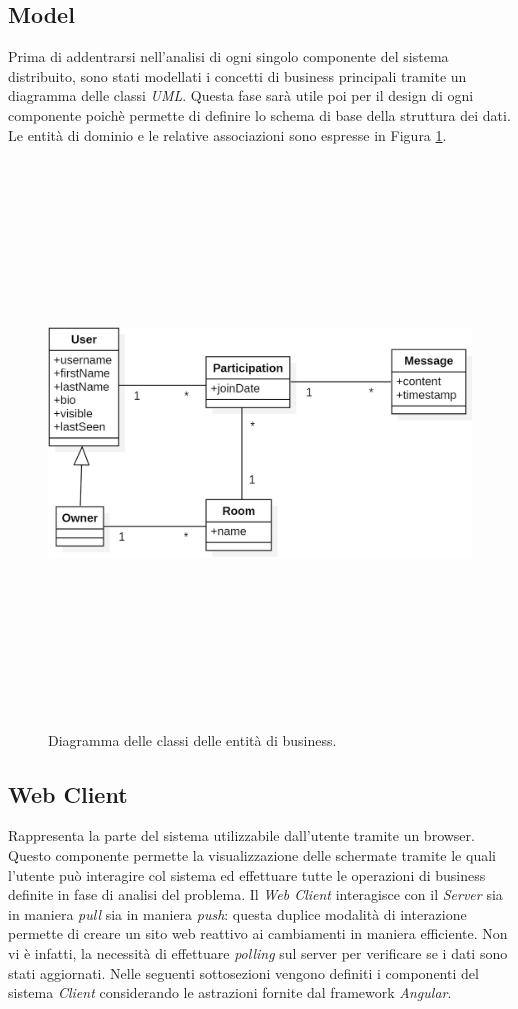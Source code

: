 \subsection{Model}
Prima di addentrarsi nell'analisi di ogni singolo componente del sistema distribuito, sono stati modellati i concetti di business principali tramite un diagramma delle classi \textit{UML}. Questa fase sarà utile poi per il design di ogni componente poichè permette di definire lo schema di base della struttura dei dati. Le entità di dominio e le relative associazioni sono espresse in Figura \ref{fig:model-class-diagram}.
\begin{figure}
  \centering
  \includegraphics[height=15cm, width=12cm,
		keepaspectratio]{images/ModelClassDiagram.png}
  \caption{Diagramma delle classi delle entità di business.}
  \label{fig:model-class-diagram}
\end{figure}

\subsection{Web Client}
Rappresenta la parte del sistema utilizzabile dall'utente tramite un browser. Questo componente permette la visualizzazione delle schermate tramite le quali l'utente può interagire col sistema ed effettuare tutte le operazioni di business definite in fase di analisi del problema. Il \textit{Web Client} interagisce con il \textit{Server} sia in maniera \textit{pull} sia in maniera \textit{push}: questa duplice modalità di interazione permette di creare un sito web reattivo ai cambiamenti in maniera efficiente. Non vi è infatti, la necessità di effettuare \textit{polling} sul server per verificare se i dati sono stati aggiornati.
Nelle seguenti sottosezioni vengono definiti i componenti del sistema \textit{Client} considerando le astrazioni fornite dal framework \textit{Angular}.
